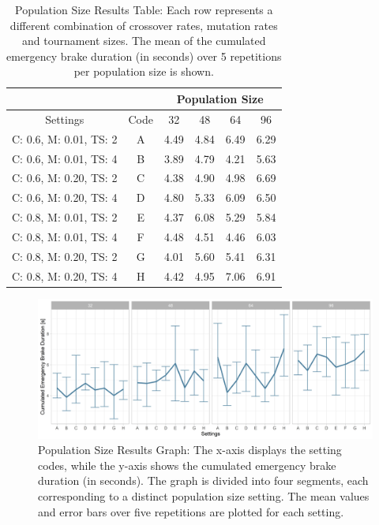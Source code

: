 \begin{table}[ht]
	\centering
	\begin{tabular}{ |c|c|cccc|  }
		\cline{3-6}
		\multicolumn{2}{c|}{} & \multicolumn{4}{c|}{Population Size} \\
		\hline
		Settings & Code & 32 & 48 & 64 & 96\\
		\hline
		C: 0.6, M: 0.01, TS: 2   	& A & 4.49 & 4.84 & 6.49 & 6.29 \\
		C: 0.6, M: 0.01, TS: 4		& B & 3.89 & 4.79 & 4.21 & 5.63 \\ 
		C: 0.6, M: 0.20, TS: 2 		& C & 4.38 & 4.90 & 4.98 & 6.69 \\
		C: 0.6, M: 0.20, TS: 4    	& D & 4.80 & 5.33 & 6.09 & 6.50 \\
		C: 0.8, M: 0.01, TS: 2   	& E & 4.37 & 6.08 & 5.29 & 5.84 \\
		C: 0.8, M: 0.01, TS: 4		& F & 4.48 & 4.51 & 4.46 & 6.03 \\
		C: 0.8, M: 0.20, TS: 2 		& G & 4.01 & 5.60 & 5.41 & 6.31 \\
		C: 0.8, M: 0.20, TS: 4    	& H & 4.42 & 4.95 & 7.06 & 6.91 \\
		\hline
	\end{tabular}
	\caption{Population Size Results Table: Each row represents a different combination of crossover rates, mutation rates and tournament sizes. The mean of the cumulated emergency brake duration (in seconds) over 5 repetitions per population size is shown.}
	\label{tab:hyperparameter_tuning:pop_settings_results}
\end{table}

\begin{figure}[ht] 
	\includegraphics[width=1\linewidth]{simulations/population/plots/comparison}
	\caption{Population Size Results Graph: The x-axis displays the setting codes, while the y-axis shows the cumulated emergency brake duration (in seconds). The graph is divided into four segments, each corresponding to a distinct population size setting. The mean values and error bars over five repetitions are plotted for each setting.}
	\label{fig:hyperparameter_tuning:population_results}
\end{figure}

